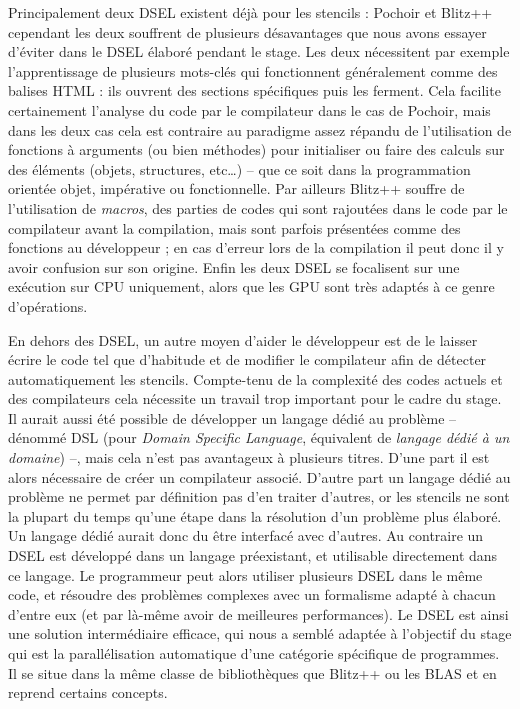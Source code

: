 Principalement deux DSEL existent déjà pour les stencils : \textsf{Pochoir} et \textsf{Blitz++} cependant les deux souffrent de plusieurs désavantages que nous avons essayer d'éviter dans le DSEL élaboré pendant le stage. Les deux nécessitent par exemple l'apprentissage de plusieurs mots-clés qui fonctionnent généralement comme des balises HTML : ils ouvrent des sections spécifiques puis les ferment. Cela facilite certainement l'analyse du code par le compilateur dans le cas de \textsf{Pochoir}, mais dans les deux cas cela est contraire au paradigme assez répandu de l'utilisation de fonctions à arguments (ou bien méthodes) pour initialiser ou faire des calculs sur des éléments (objets, structures, etc\ldots) -- que ce soit dans la programmation orientée objet, impérative ou fonctionnelle. Par ailleurs \textsf{Blitz++} souffre de l'utilisation de \emph{macros}, des parties de codes qui sont rajoutées dans le code par le compilateur avant la compilation, mais sont parfois présentées comme des fonctions au développeur ; en cas d'erreur lors de la compilation il peut donc il y avoir confusion sur son origine. Enfin les deux DSEL se focalisent sur une exécution sur CPU uniquement, alors que les GPU sont très adaptés à ce genre d'opérations.

En dehors des DSEL, un autre moyen d'aider le développeur est de le laisser écrire le code tel que d'habitude et de modifier le compilateur afin de détecter automatiquement les stencils. Compte-tenu de la complexité des codes actuels et des compilateurs cela nécessite un travail trop important pour le cadre du stage. Il aurait aussi été possible de développer un langage dédié au problème -- dénommé DSL (pour \emph{Domain Specific Language}, équivalent de \emph{langage dédié à un domaine}) --, mais cela n'est pas avantageux à plusieurs titres. D'une part il est alors nécessaire de créer un compilateur associé. D'autre part un langage dédié au problème ne permet par définition pas d'en traiter d'autres, or les stencils ne sont la plupart du temps qu'une étape dans la résolution d'un problème plus élaboré. Un langage dédié aurait donc du être interfacé avec d'autres. Au contraire un DSEL est développé dans un langage préexistant, et utilisable directement dans ce langage. Le programmeur peut alors utiliser plusieurs DSEL dans le même code, et résoudre des problèmes complexes avec un formalisme adapté à chacun d'entre eux (et par là-même avoir de meilleures performances). Le DSEL est ainsi une solution intermédiaire efficace, qui nous a semblé adaptée à l'objectif du stage qui est la parallélisation automatique d'une catégorie spécifique de programmes. Il se situe dans la même classe de bibliothèques que \textsf{Blitz++} ou les \textsf{BLAS} et en reprend certains concepts.

